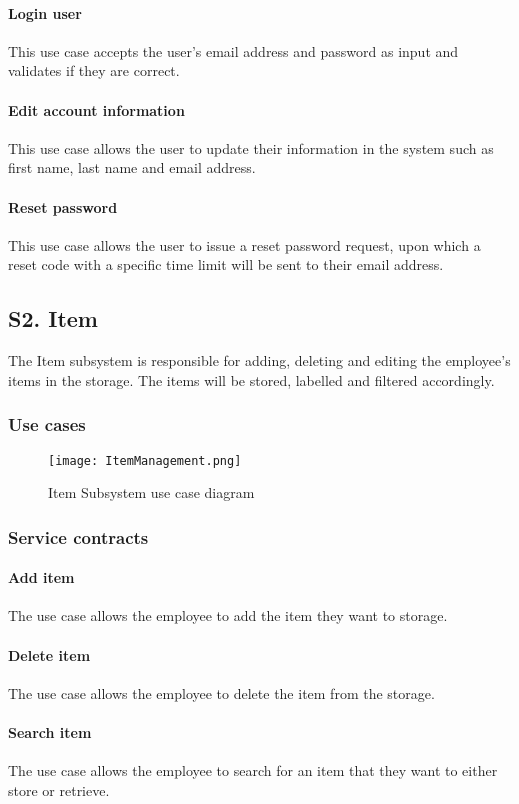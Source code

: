 \documentclass[hidelinks, 12pt, a4paper]{article}
\begin{document}
\begin{itemize}
    \paragraph{Login user}
    This use case accepts the user's email address and password as input and validates if they are correct.
    \paragraph{Edit account information}
    This use case allows the user to update their information in the system such as first name, last name and email address.
    \paragraph{Reset password}
    This use case allows the user to issue a reset password request, upon which a reset code with a specific time limit will be sent to their email address.

    \subsection{S2. Item}
    The Item subsystem is responsible for adding, deleting and editing the employee's items in the storage. The items will be stored, labelled and filtered accordingly.
    \subsubsection{Use cases}
    \begin{figure}[H]
        \centering
        \texttt{[image: ItemManagement.png]}
        \caption{Item Subsystem use case diagram}
        \label{fig:Item SubsystemDiagram}
    \end{figure}
    \subsubsection{Service contracts}
    \paragraph{Add item}
    The use case allows the employee to add the item they want to storage.
    \paragraph{Delete item}
    The use case allows the employee to delete the item from the storage.
    \paragraph{Search item}
    The use case allows the employee to search for an item that they want to either store or retrieve.

\end{itemize}
\end{document}
